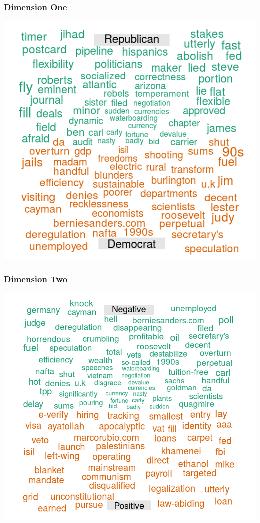 \documentclass[11pt, table, dvipsnames]{beamer}
\begin{document}
\begin{frame}
  \frametitle{Dimension One}
  \includegraphics[scale=0.45]{Dim1.png}\\
\end{frame}

\begin{frame}
  \frametitle{Dimension Two}
  \includegraphics[scale=0.40]{Dim2.png}\\
\end{frame}
\end{document}
